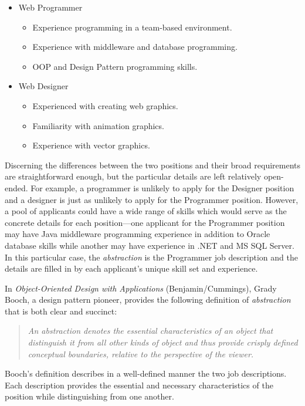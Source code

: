 \documentclass[12pt]{report}
\begin{document}
\begin{itemize}
\item Web Programmer
\begin{itemize}
\item Experience programming in a team-based environment.
\item Experience with middleware and database programming.
\item OOP and Design Pattern programming skills.
\end{itemize}
\item Web Designer
\begin{itemize}
\item Experienced with creating web graphics.
\item Familiarity with animation graphics.
\item Experience with vector graphics.
\end{itemize}
\end{itemize}

Discerning the differences between the two positions and their broad requirements are straightforward enough, but the particular details are left relatively open-ended. For example, a programmer is unlikely to apply for the Designer position and a designer is just as unlikely to apply for the Programmer position. However, a pool of applicants could have a wide range of skills which would serve as the concrete details for each position---one applicant for the Programmer position may have Java middleware programming experience in addition to Oracle database skills while another may have experience in .NET and MS SQL Server. In this particular case, the \textit{abstraction} is the Programmer job description and the details are filled in by each applicant's unique skill set and experience.

In \textit{Object-Oriented Design with Applications} (Benjamin/Cummings), Grady Booch, a design pattern pioneer, provides the following definition of \textit{abstraction} that is both clear and succinct:

\begin{quotation}
\textit{An abstraction denotes the essential characteristics of an object that distinguish it from all other kinds of object and thus provide crisply defined conceptual boundaries, relative to the perspective of the viewer.}
\end{quotation}

Booch's definition describes in a well-defined manner the two job descriptions. Each description provides the essential and necessary characteristics of the position while distinguishing from one another.
\end{document}
